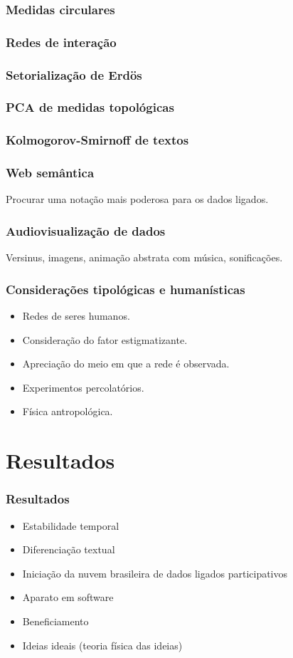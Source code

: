 \documentclass[10pt]{beamer}
\begin{document}
\begin{frame}
\frametitle{Medidas circulares}
\end{frame}
\begin{frame}
\frametitle{Redes de interação}
\end{frame}
\begin{frame}
\frametitle{Setorialização de Erdös}
\end{frame}
\begin{frame}
\frametitle{PCA de medidas topológicas}
\end{frame}
\begin{frame}
\frametitle{Kolmogorov-Smirnoff de textos}
\end{frame}
\begin{frame}
\frametitle{Web semântica}
Procurar uma notação mais poderosa para os dados ligados.
\end{frame}
\begin{frame}
\frametitle{Audiovisualização de dados}
Versinus, imagens, animação abstrata com música, sonificações.
\end{frame}

\begin{frame}
\frametitle{Considerações tipológicas e humanísticas}
\begin{itemize}
	\item Redes de seres humanos.
	\item Consideração do fator estigmatizante.
	\item Apreciação do meio em que a rede é observada.
	\item Experimentos percolatórios.
	\item Física antropológica.
\end{itemize}
\end{frame}

\section{Resultados}
\begin{frame}
\frametitle{Resultados}
\begin{itemize}
	\item Estabilidade temporal
	\item Diferenciação textual
	\item Iniciação da nuvem brasileira de dados ligados participativos
	\item Aparato em software
	\item Beneficiamento
	\item Ideias ideais (teoria física das ideias)
\end{itemize}
\end{frame}
\end{document}
